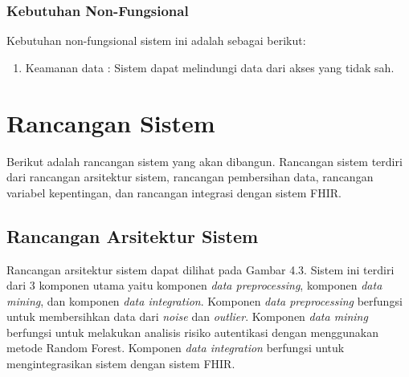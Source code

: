 \subsubsection{Kebutuhan Non-Fungsional}
Kebutuhan non-fungsional sistem ini adalah sebagai berikut:
\begin{enumerate}
    \item Keamanan data : Sistem dapat melindungi data dari akses yang tidak sah.
\end{enumerate}

\section{Rancangan Sistem}
Berikut adalah rancangan sistem yang akan dibangun. Rancangan sistem terdiri dari rancangan arsitektur sistem, rancangan pembersihan data, rancangan variabel kepentingan, dan rancangan integrasi dengan sistem FHIR.

\subsection{Rancangan Arsitektur Sistem}
Rancangan arsitektur sistem dapat dilihat pada Gambar 4.3. Sistem ini terdiri dari 3 komponen utama yaitu komponen \textit{data preprocessing}, komponen \textit{data mining}, dan komponen \textit{data integration}. Komponen \textit{data preprocessing} berfungsi untuk membersihkan data dari \textit{noise} dan \textit{outlier}. Komponen \textit{data mining} berfungsi untuk melakukan analisis risiko autentikasi dengan menggunakan metode Random Forest. Komponen \textit{data integration} berfungsi untuk mengintegrasikan sistem dengan sistem FHIR.

